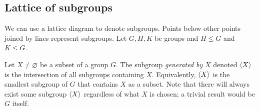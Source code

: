 \subsection{Lattice of subgroups}
We can use a lattice diagram to denote subgroups.
Points below other points joined by lines represent subgroups.
Let \(G, H, K\) be groups and \(H \leq G\) and \(K \leq G\).


\begin{definition}
	Let \(X \neq \varnothing\) be a subset of a group \(G\).
	The subgroup \textit{generated by} \(X\) denoted \(\langle{} X \rangle\) is the intersection of all subgroups containing \(X\).
	Equivalently, \(\langle{} X \rangle\) is the smallest subgroup of \(G\) that contains \(X\) as a subset.
	Note that there will always exist some subgroup \(\langle{} X \rangle\) regardless of what \(X\) is chosen; a trivial result would be \(G\) itself.
\end{definition}
